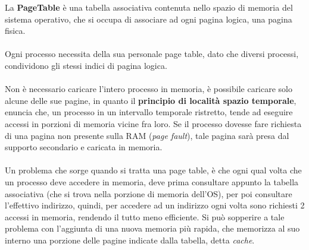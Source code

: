 \documentclass[12pt, letterpaper]{article}
\newcommand{\acc}{\\\hphantom{}\\}
\begin{document}
La \textbf{PageTable} è una tabella associativa contenuta nello spazio di memoria del sistema operativo, che si occupa 
di associare ad ogni pagina logica, una pagina fisica.\acc 
Ogni processo necessita della sua personale page table, dato che diversi processi,
condividono gli stessi indici di pagina logica.\acc 
Non è necessario caricare l'intero processo in memoria, è possibile caricare solo alcune delle sue pagine, in quanto 
il \textbf{principio di località spazio temporale}, enuncia che, un processo in un intervallo temporale 
ristretto, tende ad eseguire accessi in porzioni di memoria vicine fra loro. Se il processo dovesse fare richiesta 
di una pagina non presente sulla RAM (\textit{page fault}), tale pagina sarà presa dal supporto secondario e caricata 
in memoria.\acc 
Un problema che sorge quando si tratta una page table, è che ogni qual volta che un processo deve accedere in memoria, deve 
prima consultare appunto la tabella associativa (che si trova nella porzione di memoria dell'OS), per poi consultare 
l'effettivo indirizzo, quindi, per accedere ad un indirizzo ogni volta sono richiesti 2 accessi in memoria, rendendo il tutto 
meno efficiente. Si può sopperire a tale problema 
con l’aggiunta di una nuova memoria più rapida, che memorizza al suo interno una porzione 
delle pagine indicate dalla tabella, detta \textit{cache}.
\end{document}
